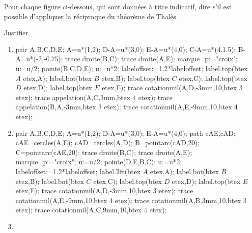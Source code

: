 \begin{exercice*}
    Pour chaque figure ci-dessous, qui sont données à titre indicatif, dire s’il est possible d’appliquer la réciproque du théorème de Thalès.

    Justifier.
    \begin{enumerate}
        \item \phantom{rrr}
        
        \begin{Geometrie}[CoinHD={(6u,4u)},CoinBG={(-2u,0)}]
            pair A,B,C,D,E;
            A=u*(1,2);
            D-A=u*(3,0);
            E-A=u*(4,0);
            C-A=u*(4,1.5);
            B-A=u*(-2,-0.75);
            trace droite(B,C);
            trace droite(A,E);
            marque_p:="croix";
            u:=u/2;
            pointe(B,C,D,E);
            u:=u*2;
            labeloffset:=1.2*labeloffset;
            label.top(btex $A$ etex,A);
            label.bot(btex $B$ etex,B);
            label.top(btex $C$ etex,C);
            label.top(btex $D$ etex,D);
            label.top(btex $E$ etex,E);
            trace cotationmil(A,D,-3mm,10,btex 3 etex);
            trace appelation(A,C,3mm,btex 4 etex);
            trace appelation(B,A,-3mm,btex 3 etex);
            trace cotationmil(A,E,-9mm,10,btex 4 etex);
        \end{Geometrie}
        \item \phantom{rrr}
        
        \begin{Geometrie}[CoinHD={(6u,5u)},CoinBG={(0,0.5u)}]
            pair A,B,C,D,E;
            A=u*(1,2);
            D-A=u*(3,0);
            E-A=u*(4,0);
            path cAE,cAD;
            cAE=cercles(A,E);
            cAD=cercles(A,D);
            B=pointarc(cAD,20);
            C=pointarc(cAE,20);
            trace droite(B,C);
            trace droite(A,E);
            marque_p:="croix";
            u:=u/2;
            pointe(D,E,B,C);
            u:=u*2;
            labeloffset:=1.2*labeloffset;
            label.llft(btex $A$ etex,A);
            label.bot(btex $B$ etex,B);
            label.bot(btex $C$ etex,C);
            label.top(btex $D$ etex,D);
            label.top(btex $E$ etex,E);
            trace cotationmil(A,D,-3mm,10,btex 3 etex);
            trace cotationmil(A,E,-9mm,10,btex 4 etex);
            trace cotationmil(A,B,3mm,10,btex 3 etex);
            trace cotationmil(A,C,9mm,10,btex 4 etex);   
        \end{Geometrie}
        \pagebreak
        \item \phantom{rrr}
        

\end{enumerate}
\end{exercice*}
